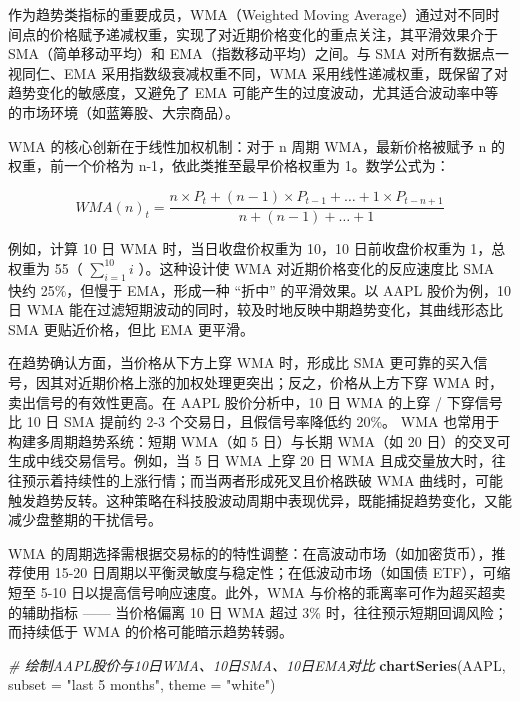 \documentclass[]{ctexbook}
\newenvironment{Shaded}{\begin{snugshade}}{\end{snugshade}}
\newcommand{\AttributeTok}[1]{\textcolor[rgb]{0.13,0.29,0.53}{#1}}
\newcommand{\CommentTok}[1]{\textcolor[rgb]{0.56,0.35,0.01}{\textit{#1}}}
\newcommand{\FunctionTok}[1]{\textcolor[rgb]{0.13,0.29,0.53}{\textbf{#1}}}
\newcommand{\NormalTok}[1]{#1}
\newcommand{\StringTok}[1]{\textcolor[rgb]{0.31,0.60,0.02}{#1}}
\begin{document}
作为趋势类指标的重要成员，WMA（Weighted Moving Average）通过对不同时间点的价格赋予递减权重，实现了对近期价格变化的重点关注，其平滑效果介于 SMA（简单移动平均）和 EMA（指数移动平均）之间。与 SMA 对所有数据点一视同仁、EMA 采用指数级衰减权重不同，WMA 采用线性递减权重，既保留了对趋势变化的敏感度，又避免了 EMA 可能产生的过度波动，尤其适合波动率中等的市场环境（如蓝筹股、大宗商品）。

WMA 的核心创新在于线性加权机制：对于 n 周期 WMA，最新价格被赋予 n 的权重，前一个价格为 n-1，依此类推至最早价格权重为 1。数学公式为：

\[
WMA(n)_t = \frac{n \times P_t + (n-1) \times P_{t-1} + \dots + 1 \times P_{t-n+1}}{n + (n-1) + \dots + 1}
\]

例如，计算 10 日 WMA 时，当日收盘价权重为 10，10 日前收盘价权重为 1，总权重为 55（ \(\sum_{i=1}^{10} i\) ）。这种设计使 WMA 对近期价格变化的反应速度比 SMA 快约 25\%，但慢于 EMA，形成一种 ``折中'' 的平滑效果。以 AAPL 股价为例，10 日 WMA 能在过滤短期波动的同时，较及时地反映中期趋势变化，其曲线形态比 SMA 更贴近价格，但比 EMA 更平滑。

在趋势确认方面，当价格从下方上穿 WMA 时，形成比 SMA 更可靠的买入信号，因其对近期价格上涨的加权处理更突出；反之，价格从上方下穿 WMA 时，卖出信号的有效性更高。在 AAPL 股价分析中，10 日 WMA 的上穿 / 下穿信号比 10 日 SMA 提前约 2-3 个交易日，且假信号率降低约 20\%。
WMA 也常用于构建多周期趋势系统：短期 WMA（如 5 日）与长期 WMA（如 20 日）的交叉可生成中线交易信号。例如，当 5 日 WMA 上穿 20 日 WMA 且成交量放大时，往往预示着持续性的上涨行情；而当两者形成死叉且价格跌破 WMA 曲线时，可能触发趋势反转。这种策略在科技股波动周期中表现优异，既能捕捉趋势变化，又能减少盘整期的干扰信号。

WMA 的周期选择需根据交易标的的特性调整：在高波动市场（如加密货币），推荐使用 15-20 日周期以平衡灵敏度与稳定性；在低波动市场（如国债 ETF），可缩短至 5-10 日以提高信号响应速度。此外，WMA 与价格的乖离率可作为超买超卖的辅助指标 ------ 当价格偏离 10 日 WMA 超过 3\% 时，往往预示短期回调风险；而持续低于 WMA 的价格可能暗示趋势转弱。

\begin{Shaded}
\begin{Highlighting}[]
\CommentTok{\# 绘制AAPL股价与10日WMA、10日SMA、10日EMA对比}
\FunctionTok{chartSeries}\NormalTok{(AAPL, }\AttributeTok{subset =} \StringTok{"last 5 months"}\NormalTok{, }\AttributeTok{theme =} \StringTok{"white"}\NormalTok{)}
\end{Highlighting}
\end{Shaded}
\end{document}
